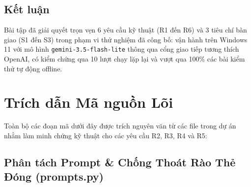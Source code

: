 \documentclass[11pt,a4paper]{article}
\begin{document}
\subsection{Kết luận}

Bài tập đã giải quyết trọn vẹn 6 yêu cầu kỹ thuật (R1 đến R6) và 3 tiêu chí bàn giao (S1 đến S3) trong phạm vi thử nghiệm đã công bố: vận hành trên Windows 11 với mô hình \texttt{gemini-3.5-flash-lite} thông qua cổng giao tiếp tương thích OpenAI, có kiểm chứng qua 10 lượt chạy lặp lại và vượt qua 100\% các bài kiểm thử tự động offline.

\newpage
\appendix
\section{Trích dẫn Mã nguồn Lõi}

Toàn bộ các đoạn mã dưới đây được trích nguyên văn từ các file trong dự án nhằm làm minh chứng kỹ thuật cho các yêu cầu R2, R3, R4 và R5:

\subsection{Phân tách Prompt \& Chống Thoát Rào Thẻ Đóng (prompts.py)}
\end{document}
